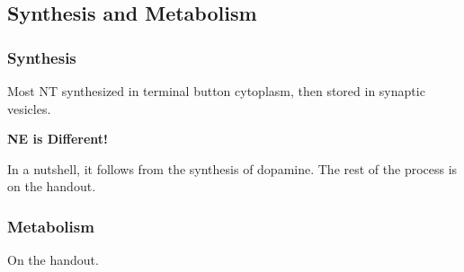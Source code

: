 \subsection{Synthesis and Metabolism}

\subsubsection{Synthesis}

\begin{coloredlist}
    \item Most NT synthesized in terminal button cytoplasm, then stored in synaptic vesicles.
    \item \textbf{NE is Different!}
    \item In a nutshell, it follows from the synthesis of dopamine. The rest of the process is on the handout.
\end{coloredlist}

\subsubsection{Metabolism}

\begin{coloredlist}
    \item On the handout.
\end{coloredlist}

